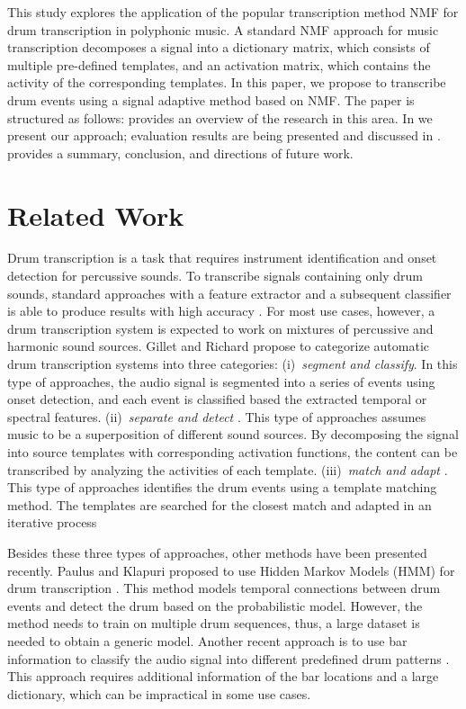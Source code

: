\documentclass{article}
\begin{document}
This study explores the application of the popular transcription method NMF for drum transcription in polyphonic music. A standard NMF approach for music transcription decomposes a signal into a dictionary matrix, which consists of multiple pre-defined templates, and an activation matrix, which contains the activity of the corresponding templates. In this paper, we propose to transcribe drum events using a signal adaptive method based on NMF. The paper is structured as follows:  provides an overview of the research in this area. In  we present our approach; evaluation results are being presented and discussed in .  provides a summary, conclusion, and directions of future work.

\section{Related Work}\label{sec:related works}
Drum transcription is a task that requires instrument identification and onset detection for percussive sounds. To transcribe signals containing only drum sounds, standard approaches with a feature extractor and a subsequent classifier is able to produce results with high accuracy \cite{herrera_automatic_2003}. For most use cases, however, a drum transcription system is expected to work on mixtures of percussive and harmonic sound sources. Gillet and Richard propose to categorize automatic drum transcription systems into three categories: (i)~\textit{segment and classify}\cite{gillet_automatic_2004, tanghe_algorithm_2005, dittmar_drum_2005}. In this type of approaches, the audio signal is segmented into a series of events using onset detection, and each event is classified based the extracted temporal or spectral features. (ii)~\textit{separate and detect} \cite{fitzgerald_sub-band_2002, fitzgerald_drum_2003, paulus_drum_2005,moreau_drum_2007,alves_drum_2009}. This type of approaches assumes music to be a superposition of different sound sources. By decomposing the signal into source templates with corresponding activation functions, the content can be transcribed by analyzing the activities of each template. (iii)~\textit{match and adapt} \cite{yoshii_automatic_2004, yoshii_drum_2007}. This type of approaches identifies the drum events using a template matching method. The templates are searched for the closest match and adapted in an iterative process   

Besides these three types of approaches, other methods have been presented recently. Paulus and Klapuri proposed to use Hidden Markov Models (HMM) for drum transcription \cite{Paulus2009a}. This method models temporal connections between drum events and detect the drum based on the probabilistic model. However, the method needs to train on multiple drum sequences, thus, a large dataset is needed to obtain a generic model. Another recent approach is to use bar information to classify the audio signal into different predefined drum patterns \cite{Thompson2014}. This approach requires additional information of the bar locations and a large dictionary, which can be impractical in some use cases.
\end{document}
